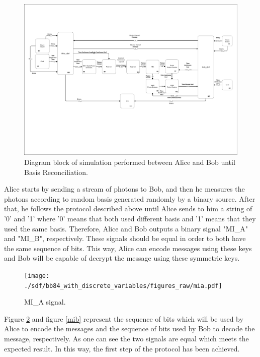 \begin{figure}[h]
    \centering
        \includegraphics[clip=true, trim=0.5cm 5.0cm 0.5cm 2.5cm, width=1.10\textwidth]{./sdf/bb84_with_discrete_variables/figures_raw/Simulation_toplevel_bb84.pdf}
    \caption{Diagram block of simulation performed between Alice and Bob until Basis Reconciliation. }\label{toplevelalicebob}
\end{figure}

Alice starts by sending a stream of photons to Bob, and then he measures the photons according to random basis generated randomly by a binary source. After that, he follows the protocol described above until Alice sends to him a string of '0' and '1' where '0' means that both used different basis and '1' means that they used the same basis. Therefore, Alice and Bob outputs a binary signal "MI\_A" and "MI\_B", respectively. These signals should be equal in order to both have the same sequence of bits. This way, Alice can encode messages using these keys and Bob will be capable of decrypt the message using these symmetric keys.

\begin{figure}[H]
    \centering
        \texttt{[image: ./sdf/bb84\_with\_discrete\_variables/figures\_raw/mia.pdf]}
    \caption{MI\_A signal. }\label{mia}
\end{figure}

Figure \ref{mia} and figure \ref{mib} represent the sequence of bits which will be used by Alice to encode the messages and the sequence of bits used by Bob to decode the message, respectively. As one can see the two signals are equal which meets the expected result. In this way, the first step of the protocol has been achieved.

